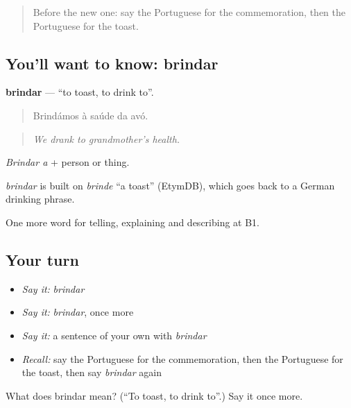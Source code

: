 \label{lesson:PT-C318-brindar}



\begin{quote}
Before the new one: say the Portuguese for the commemoration, then the Portuguese for the toast.
\end{quote}

\subsection*{You'll want to know: brindar}
\textbf{brindar} — \textquotedblleft{}to toast, to drink to\textquotedblright{}.

\begin{quote}
Brindámos à saúde da avó.
\end{quote}

\begin{quote}
\emph{We drank to grandmother’s health.}
\end{quote}

\emph{Brindar a} + person or thing.

\begin{cousinweb}
\emph{brindar} is built on \emph{brinde} \textquotedblleft{}a toast\textquotedblright{} (EtymDB), which goes back to a German drinking phrase.
\end{cousinweb}

\begin{grammarlens}[title={What you've built}]
One more word for telling, explaining and describing at B1.
\end{grammarlens}

\subsection*{Your turn}
\begin{itemize}
\raggedright
  \item \emph{Say it:} \emph{brindar}
  \item \emph{Say it:} \emph{brindar}, once more
  \item \emph{Say it:} a sentence of your own with \emph{brindar}
  \item \emph{Recall:} say the Portuguese for the commemoration, then the Portuguese for the toast, then say \emph{brindar} again
\end{itemize}

\begin{tcolorbox}[breakable,colback=teal!4,colframe=teal!35!black,title={Before you move on}]
What does brindar mean? (\textquotedblleft{}To toast, to drink to\textquotedblright{}.) Say it once more.
\end{tcolorbox}

